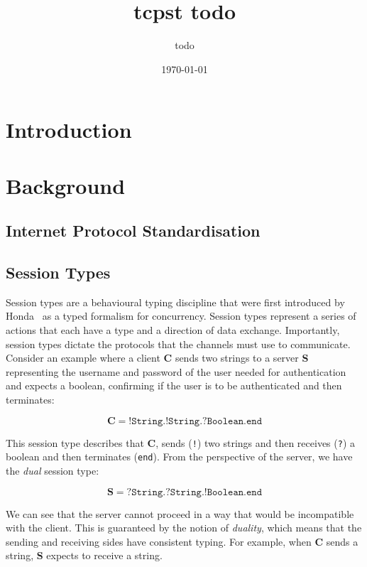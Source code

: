 \documentclass{article}
\title{tcpst todo}
\author{todo}
\date{\today}
\newcommand{\type}[1]{\texttt{#1}}
\begin{document}
\maketitle

\section{Introduction}

\section{Background}

\subsection{Internet Protocol Standardisation}

\subsection{Session Types}

Session types are a behavioural typing discipline that were first introduced by Honda~\cite{H93} as a typed formalism for concurrency.
Session types represent a series of actions that each have a type and a direction of data exchange.
Importantly, session types dictate the protocols that the channels must use to communicate.
Consider an example where a client \textbf{C} sends two strings to a server \textbf{S} representing the username and password of the user needed for authentication and expects a boolean, confirming if the user is to be authenticated and then terminates:

\begin{equation*}
    \textbf{C} \; = \; \type{!String.!String.?Boolean.end}
\end{equation*}

This session type describes that \textbf{C}, sends (\type{!}) two strings and then receives (\type{?}) a boolean and then terminates (\type{end}). From the perspective of the server, we have the \textit{dual} session type:

\begin{equation*}
    \textbf{S} \; = \; \type{?String.?String.!Boolean.end}
\end{equation*}

We can see that the server cannot proceed in a way that would be incompatible with the client. This is guaranteed by the notion of \textit{duality}, which means that the sending and receiving sides have consistent typing.
For example, when \textbf{C} sends a string, \textbf{S} expects to receive a string.
\end{document}
